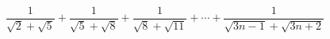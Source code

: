 $\dfrac{1}{\sqrt{2}+\sqrt{5}}+\dfrac{1}{\sqrt{5}+\sqrt{8}}+\dfrac{1}{\sqrt{8}+\sqrt{11}}+\cdots+\dfrac{1}{\sqrt{3n-1}+\sqrt{3n+2}}$
